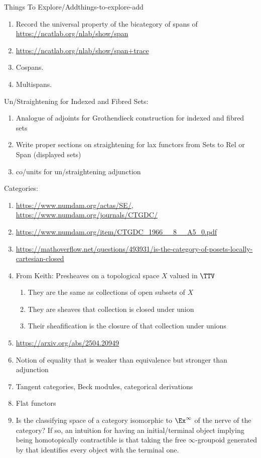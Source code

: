 \begin{remark}{Things To Explore/Add}{things-to-explore-add}
\begin{enumerate}
\begin{enumerate}
            \end{enumerate}
        \item Record the universal property of the bicategory of spans of \url{https://ncatlab.org/nlab/show/span}
        \item \url{https://ncatlab.org/nlab/show/span+trace}
        \item Cospans.
        \item Multispans.
    \end{enumerate}
    Un/Straightening for Indexed and Fibred Sets:
    \begin{enumerate}
        \item Analogue of adjoints for Grothendieck construction for indexed and fibred sets
        \item Write proper sections on straightening for lax functors from Sets to Rel or Span (displayed sets)
        \item co/units for un/straightening adjunction
    \end{enumerate}
    Categories:
    \begin{enumerate}
        \item \url{https://www.numdam.org/actas/SE/}, \url{https://www.numdam.org/journals/CTGDC/}
        \item \url{https://www.numdam.org/item/CTGDC_1966__8__A5_0.pdf}
        \item \url{https://mathoverflow.net/questions/493931/is-the-category-of-posets-locally-cartesian-closed}
        \item From Keith: Presheaves on a topological space $X$ valued in $\TTV$
            \begin{enumerate}
                \item They are the same as collections of open subsets of $X$
                \item They are sheaves \textiff that collection is closed under union
                \item Their sheafification is the closure of that collection under unions
            \end{enumerate}
        \item \url{https://arxiv.org/abs/2504.20949}
        \item Notion of equality that is weaker than equivalence but stronger than adjunction
        \item Tangent categories, Beck modules, categorical derivations
        \item Flat functors
        \item Is the classifying space of a category isomorphic to $\Ex^{\infty}$ of the nerve of the category? If so, an intuition for having an initial/terminal object implying being homotopically contractible is that taking the free $\infty$-groupoid generated by that identifies every object with the terminal one.

\end{enumerate}
\end{remark}
